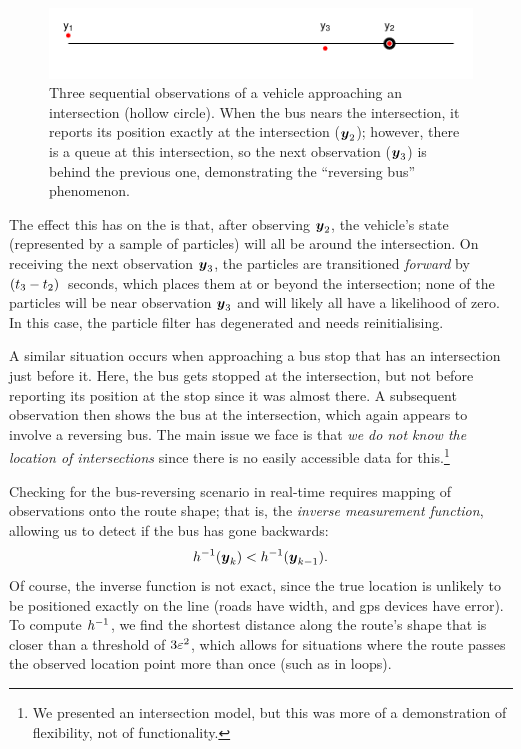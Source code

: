 \begin{knitrout}\small
{}\color{fgcolor}\begin{figure}

{\centering \includegraphics[width=.8\textwidth]{figure/bus_going_backwards-1} 

}

\caption[Visual demonstration of the ``reversing bus'' phenomenon]{Three sequential observations of a vehicle approaching an intersection (hollow circle). When the bus nears the intersection, it reports its position exactly at the intersection ($\boldsymbol{y}_2$); however, there is a queue at this intersection, so the next observation ($\boldsymbol{y}_3$) is behind the previous one, demonstrating the ``reversing bus'' phenomenon.}\label{fig:bus_going_backwards}
\end{figure}


\end{knitrout}


The effect this has on the \pf{} is that, after observing $\boldsymbol{y}_2$, the vehicle's state (represented by a sample of particles) will all be around the intersection. On receiving the next observation $\boldsymbol{y}_3$, the particles are transitioned \emph{forward} by $(t_3 - t_2)$~seconds, which places them at or beyond the intersection; none of the particles will be near observation $\boldsymbol{y}_3$ and will likely all have a likelihood of zero. In this case, the particle filter has degenerated and needs reinitialising.


A similar situation occurs when approaching a bus stop that has an intersection just before it. Here, the bus gets stopped at the intersection, but not before reporting its position at the stop since it was almost there. A subsequent observation then shows the bus at the intersection, which again appears to involve a reversing bus. The main issue we face is that \emph{we do not know the location of intersections} since there is no easily accessible data for this.\footnote{We presented an intersection model, but this was more of a demonstration of flexibility, not of functionality.}


Checking for the bus-reversing scenario in real-time requires mapping of observations onto the route shape; that is, the \emph{inverse measurement function}, allowing us to detect if the bus has gone backwards:
\begin{equation}
\label{eq:vehicle_rev_check}
h^{-1}(\boldsymbol{y}_k) < h^{-1}(\boldsymbol{y}_{k-1}).
\end{equation}
Of course, the inverse function is not exact, since the true location is unlikely to be positioned exactly on the line (roads have width, and \gls{gps} devices have error). To compute $h^{-1}$, we find the shortest distance along the route's shape that is closer than a threshold of $3\varepsilon^2$, which allows for situations where the route passes the observed location point more than once (such as in loops).

